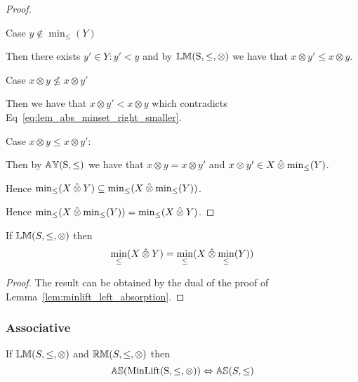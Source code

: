 \documentclass[../Summary.tex]{subfiles}
\begin{document}
\begin{proof}
\begin{ind}
Case $y \notin \min_\leq(Y)$
\begin{ind}
Then there exists $y' \in Y : y' < y$ and by ${\mathbb{LM}}\mathrm{(S,\leq,\otimes)}$ we have that $x \otimes y' \leq x \otimes y$.

\vspace{0.5em}

Case $x \otimes y \nleq x \otimes y'$
\begin{ind}
Then we have that $x \otimes y' < x \otimes y$ which contradicts Eq~\ref{eq:lem_abs_minset_right_smaller}.
\end{ind}
Case $x \otimes y \leq x \otimes y'$:
\begin{ind}
Then by ${\mathbb{AY}}\mathrm{(S,\leq)}$ we have that $x \otimes y = x \otimes y'$ and $x \otimes y' \in X \mathbin{\hat{\otimes}} \min_\leq(Y)$.
\end{ind}
\end{ind}
\end{ind}
Hence $\min_\leq(X \mathbin{\hat{\otimes}} Y) \subseteq \min_\leq(X \mathbin{\hat{\otimes}} \min_\leq(Y))$.

\vspace{2em}

Hence $\min_\leq(X \mathbin{\hat{\otimes}} \min_\leq(Y)) = \min_\leq(X \mathbin{\hat{\otimes}} Y)$.
\end{proof}



\vspace{2em}




\begin{lemma} \label{lem:minlift_right_absorption}
If ${\mathbb{LM}}(S,\leq,\otimes)$ then
\begin{equation*}
\min_\leq(X \mathbin{\hat{\otimes}} Y) = \min_\leq(X \mathbin{\hat{\otimes}} \min_\leq(Y))
\end{equation*}
\end{lemma}

\begin{proof} The result can be obtained by the dual of the proof of Lemma~\ref{lem:minlift_left_absorption}.
\end{proof}
 



\subsubsection{Associative}

\begin{theorem} \label{thm:minlift_as}
If ${\mathbb{LM}}(S,\leq,\otimes)$ and ${\mathbb{RM}}(S,\leq,\otimes)$ then
\begin{equation*}
{\mathbb{AS}}(\mathrm{MinLift(S,\leq,\otimes)}) \Leftrightarrow {\mathbb{AS}}(S,\leq)
\end{equation*}
\end{theorem}
\end{document}
